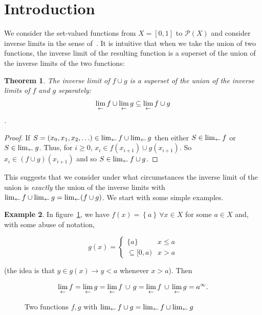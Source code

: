 \documentclass{article}
\newtheorem{thm}{Theorem}
\theoremstyle{definition}
\newtheorem{exam}[thm]{Example}
\begin{document}
\section{Introduction}

We consider the set-valued functions from $X=[0,1]$ to
$\mathcal{P}(X)$ and consider inverse limits in the sense
of~\cite{ingram2012}.  It is intuitive that when we take the union of
two functions, the inverse limit of the resulting function is a
superset of the union of the inverse limits of the two functions:

 \begin{thm}
The inverse limit of $f\cup g$ is a superset of the union of the
inverse limits of $f$ and $g$ separately: $$\lim_{\leftarrow} f \cup \lim_{\leftarrow} g
\subseteq\lim_{\leftarrow} f\cup g$$.
 \end{thm}
 \begin{proof}
If $S = (x_0, x_1, x_2, \ldots)\in\lim_{\leftarrow} f\cup\lim_{\leftarrow} g$ then
either $S\in\lim_{\leftarrow} f$ or $S\in\lim_{\leftarrow} g$.  Thus, for $i\geqslant
0$, $x_i\in f(x_{i+1})\cup g(x_{i+1})$.  So $x_i \in ( f \cup g
)(x_{i+1})$ and so $S\in\lim_{\leftarrow} f\cup g$.
 \end{proof}

This suggests that we consider under what circumstances the inverse
limit of the union is {\em exactly} the union of the inverse limits
with $\lim_{\leftarrow} f\cup\lim_{\leftarrow} g = \lim_{\leftarrow} (f\cup g)$.  We start with
some simple examples.

\begin{exam}
In figure~\ref{abuse}, we have $f(x)=\left\lbrace
a\right\rbrace\,\forall x\in X$ for some $a\in X$ and, with some abuse
of notation,

\begin{equation}
  g(x) = \begin{cases}
    \lbrace a\rbrace & x\leqslant a\\
    \subseteq[0,a) & x>a
    \end{cases}
\end{equation}

(the idea is that $y\in g(x)\longrightarrow y<a$ whenever $x>a$). Then

\begin{equation}
\lim_{\leftarrow} f = \lim_{\leftarrow} g =  \lim_{\leftarrow} f \, \cup\, g = \lim_{\leftarrow} f \,\cup\,
\lim_{\leftarrow} g = a^\infty.
\end{equation}
\end{exam}

\begin{figure}[h]
\caption{Two \label{abuse} functions $f,g$ with $\lim_{\leftarrow} f\cup g=\lim_{\leftarrow} f\cup\lim_{\leftarrow} g$}
\end{figure}
\end{document}
